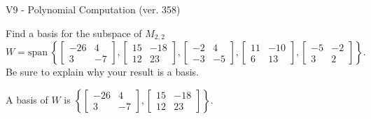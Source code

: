 \begin{exercise}
  \begin{exerciseTitle}V9 - Polynomial Computation (ver. 358)\end{exerciseTitle}
  \begin{exerciseStatement}
    Find a basis for the subspace of \(M_{2,2}\) 
\[W=\mathrm{span}\ \left\{\left[\begin{array}{cc}
-26 & 4 \\
3 & -7
\end{array}\right] , \left[\begin{array}{cc}
15 & -18 \\
12 & 23
\end{array}\right] , \left[\begin{array}{cc}
-2 & 4 \\
-3 & -5
\end{array}\right] , \left[\begin{array}{cc}
11 & -10 \\
6 & 13
\end{array}\right] , \left[\begin{array}{cc}
-5 & -2 \\
3 & 2
\end{array}\right]\right\}.\]
 Be sure to explain why your result is a basis.


  \end{exerciseStatement}
  \begin{exerciseAnswer}
   A basis of \(W\) is  \(\left\{\left[\begin{array}{cc}
-26 & 4 \\
3 & -7
\end{array}\right] , \left[\begin{array}{cc}
15 & -18 \\
12 & 23
\end{array}\right]\right\}\).
  


  \end{exerciseAnswer}
\end{exercise}